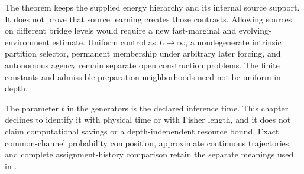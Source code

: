 The theorem keeps the supplied energy hierarchy and its internal source
support. It does not prove that source learning creates those contrasts.
Allowing sources on different bridge levels would require a new
fast-marginal and evolving-environment estimate. Uniform control as
\(L\to\infty\), a nondegenerate intrinsic partition selector,
permanent membership under arbitrary later forcing, and autonomous
agency remain separate open construction problems. The finite
constants and admissible preparation neighborhoods need not be uniform
in depth. 

The parameter \(t\) in the generators is the declared inference time.
This chapter declines to identify it with physical time or with Fisher
length, and it does not claim computational savings or a
depth-independent resource bound. Exact common-channel probability
composition, approximate continuous trajectories, and complete
assignment-history comparison retain the separate meanings used in
.
